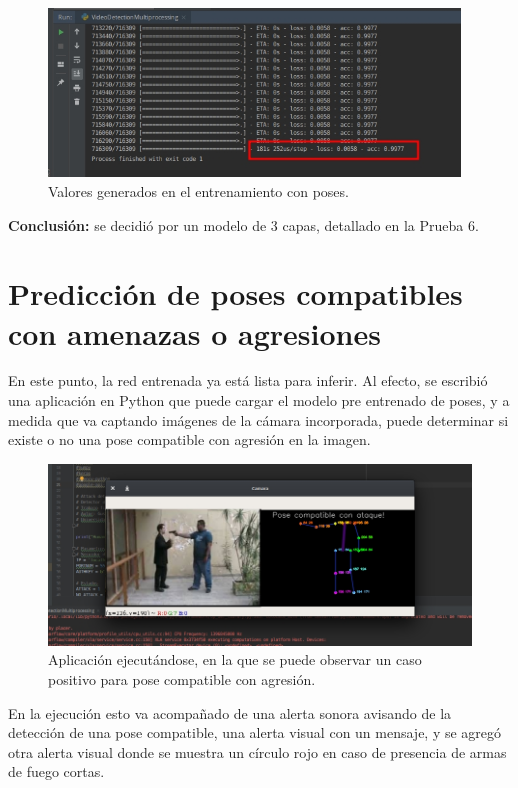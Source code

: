 \documentclass[a4paper,12pt,oneside,spanish]{book}
\begin{document}
\begin{figure}[h!]
	\includegraphics[width=310pt]{Imagenes/results2.jpg}
	\centering	
	\caption{Valores generados en el entrenamiento con poses.}
	\label{fig:results2}
\end{figure}

\textbf{Conclusión:} se decidió por un modelo de 3 capas, detallado en la Prueba 6.

\section{Predicción de poses compatibles con amenazas o agresiones}\label{prediccion}
En este punto, la red entrenada ya está lista para inferir. Al efecto, se escribió una aplicación en Python que puede cargar el modelo pre entrenado de poses, y a medida que va captando imágenes de la cámara incorporada, puede determinar si existe o no una pose compatible con agresión en la imagen.\par


\begin{figure}[h!]
	\includegraphics[width=450pt]{Imagenes/output1.jpg}
	\centering	
	\caption{Aplicación ejecutándose, en la que se puede observar un caso positivo para pose compatible con agresión.}
	\label{fig:output1}
\end{figure}

En la ejecución esto va acompañado de una alerta sonora avisando de la detección de una pose compatible, una alerta visual con un mensaje, y se agregó otra alerta visual donde se muestra un círculo rojo en caso de presencia de armas de fuego cortas.\par
\end{document}
